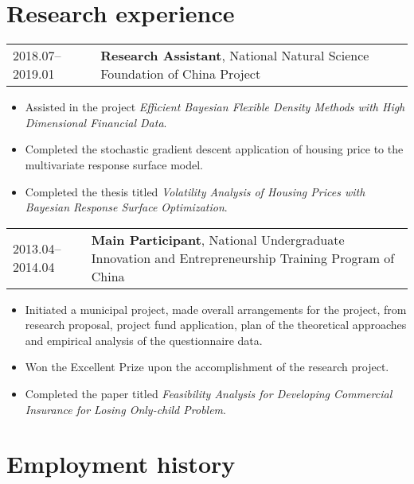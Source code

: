 \documentclass[10pt,a4paper,]{article}
\providecommand{\tightlist}{%
  \setlength{\itemsep}{0pt}\setlength{\parskip}{0pt}}
\begin{document}
\section{Research experience}\label{research-experience}

\begin{tabular}{ll}
  2018.07--2019.01 & \textbf{Research Assistant}, National Natural Science Foundation of China Project \\ 
  \end{tabular}

\begin{itemize}
\tightlist
\item
  Assisted in the project \emph{Efficient Bayesian Flexible Density
  Methods with High Dimensional Financial Data}.
\item
  Completed the stochastic gradient descent application of housing price
  to the multivariate response surface model.
\item
  Completed the thesis titled \emph{Volatility Analysis of Housing
  Prices with Bayesian Response Surface Optimization}.
\end{itemize}

\begin{tabular}{ll}
  2013.04--2014.04 & \textbf{Main Participant}, National Undergraduate Innovation and Entrepreneurship Training Program of China \\ 
  \end{tabular}

\begin{itemize}
\tightlist
\item
  Initiated a municipal project, made overall arrangements for the
  project, from research proposal, project fund application, plan of the
  theoretical approaches and empirical analysis of the questionnaire
  data.
\item
  Won the Excellent Prize upon the accomplishment of the research
  project.
\item
  Completed the paper titled \emph{Feasibility Analysis for Developing
  Commercial Insurance for Losing Only-child Problem}.
\end{itemize}

\section{Employment history}\label{employment-history}
\end{document}
